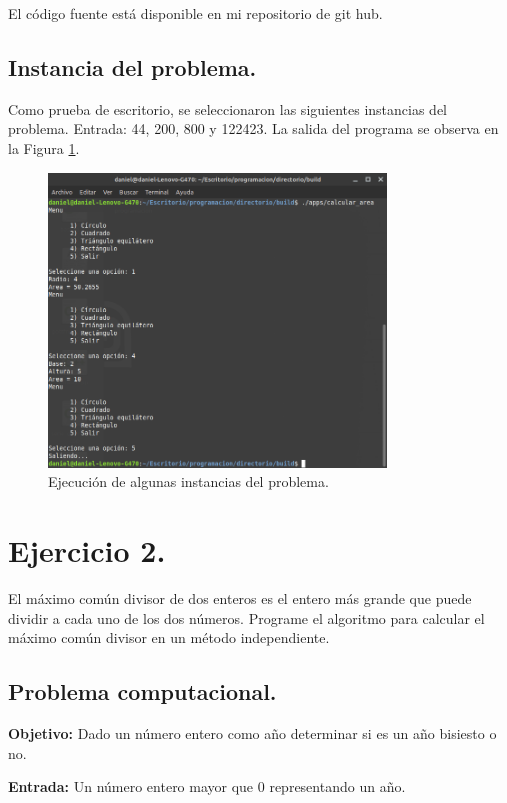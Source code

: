 \documentclass[12pt,letterpaper]{article}
\begin{document}
{El código fuente está disponible en mi repositorio de git hub. \cite{url:basilea}

\subsection{Instancia del problema.}
Como prueba de escritorio, se seleccionaron las siguientes instancias del problema. Entrada: 44, 200, 800 y 122423. La salida del programa se observa en la Figura \ref{fig:bisiesto}.
\begin{figure}[ht!]
  \centering
  \includegraphics[width=0.8\textwidth]{figures/calcular_area}
  \caption{Ejecución de algunas instancias del problema.}
  \label{fig:bisiesto}
\end{figure}

\section{Ejercicio 2.}

El m\'aximo com\'un divisor de dos enteros es el entero m\'as grande que puede dividir a cada uno de los dos n\'umeros. Programe el algoritmo para calcular el m\'aximo com\'un divisor en un m\'etodo independiente.

\subsection{Problema computacional.}
\textbf{Objetivo:} Dado un n\'umero entero como año determinar si es un año bisiesto o no.

\textbf{Entrada:} Un n\'umero entero mayor que 0 representando un año.

}
\end{document}
